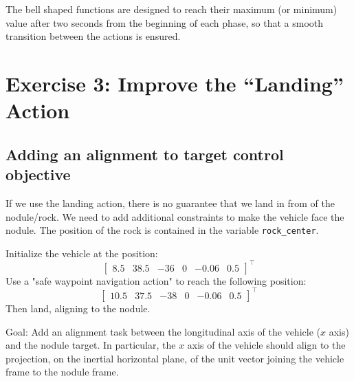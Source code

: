 \documentclass{article}
\begin{document}
The bell shaped functions are designed to reach their maximum (or minimum) value after two seconds from the beginning of each phase, so that a smooth transition between the actions is ensured.

\clearpage

\section{Exercise 3: Improve the “Landing” Action}
\subsection{Adding an alignment to target control objective}
If we use the landing action, there is no guarantee that we land in from of the nodule/rock. We need to add additional constraints to make the vehicle face the nodule. The position of the rock is contained in the variable \texttt{rock\_center}.

Initialize the vehicle at the position:
\begin{displaymath}
\begin{bmatrix} 8.5 & 38.5 & -36 & 0 & -0.06 & 0.5 \end{bmatrix}^\top
\end{displaymath}
Use a "safe waypoint navigation action" to reach the following position:
\begin{displaymath}
\begin{bmatrix} 10.5 & 37.5 & -38 & 0 & -0.06 & 0.5 \end{bmatrix}^\top
\end{displaymath}
Then land, aligning to the nodule.

Goal: Add an alignment task between the longitudinal axis of the vehicle ($x$ axis) and the nodule target. In particular, the $x$ axis of the vehicle should align to the projection, on the inertial horizontal plane, of the unit vector joining the vehicle frame to the nodule frame.
\end{document}
